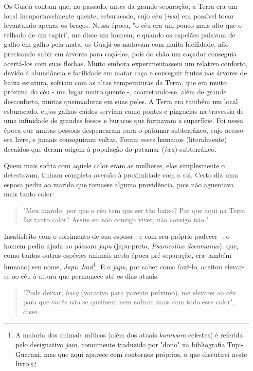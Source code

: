 Os Guajá contam que, no passado, antes da grande separação, a Terra era
um local insuportavelmente quente, esburacado, cujo céu (\emph{iwa}) era
possível tocar levantando apenas os braços. Nessa época, "o céu era um
pouco mais alto que o telhado de um tapiri", me disse um homem, e quando
os capelães pulavam de galho em galho pela mata, os Guajá os matavam com
muita facilidade, não precisando subir em árvores para caçá-los, pois do
chão um caçador conseguia acertá-los com suas flechas. Muito embora
experimentassem um relativo conforto, devido à abundância e facilidade
em matar caça e conseguir frutos nas árvores de baixa estatura, sofriam
com as altas temperaturas da Terra, que era muito próxima do céu - um
lugar muito quente -, acarretando-se, além de grande desconforto, muitas
queimaduras em suas peles. A Terra era também um local esburacado, cujos
galhos caídos serviam como pontes e pinguelas na travessia de uma
infinidade de grandes fossos e buracos que formavam a superfície. Foi
nessa época que muitas pessoas despencaram para o patamar subterrâneo,
cujo acesso era livre, e jamais conseguiram voltar. Foram esses humanos
(literalmente) decaídos que deram origem à população do patamar
(\emph{iwa}) subterrâneo.

Quem mais sofria com aquele calor eram as mulheres, elas simplesmente o
detestavam, tinham completa aversão à proximidade com o sol. Certo dia
uma esposa pediu ao marido que tomasse alguma providência, pois não
aguentava mais tanto calor:

\begin{quote}
"Meu marido, por que o céu tem que ser tão baixo? Por que aqui na Terra
faz tanto calor? Assim eu não consigo viver, não consigo não."
\end{quote}

Insatisfeito com o sofrimento de sua esposa - e com seu próprio padecer
-, o homem pediu ajuda ao pássaro \emph{japu} (japu-preto,
\emph{Psarocolius decumanus}), que, como tantas outras espécies animais
nesta época pré-separação, era também humano; seu nome, \emph{Japu
Jará}\footnote{A maioria dos animais míticos (além dos atuais
  \emph{karawara} celestes) é referida pelo designativo \emph{jara},
  comumente traduzido por "dono" na bibliografia Tupi-Guarani, mas que
  aqui aparece com contornos próprios, o que discutirei neste livro.}. E
o \emph{japu}, por saber como fazê-lo, aceitou elevar-se ao céu à altura
que permanece até os dias atuais:

\begin{quote}
"Pode deixar, \emph{hary} (vocativo para parente próximo), me elevarei
ao céu para que vocês não se queimem nem sofram mais com todo esse
calor", disse.
\end{quote}

